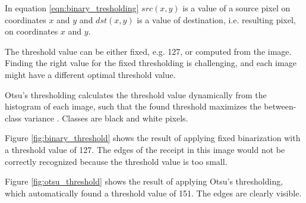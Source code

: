 \documentclass[
  printed, %
  table,   %
  oneside, %
  lof,     %
  lot,     %
]{fithesis3}
\begin{document}
\begin{enumerate}
    In equation \ref{eqn:binary_tresholding} $src(x,y)$ is a value of a source pixel on coordinates $x$ and $y$ and $dst(x,y)$ is a value of destination, i.e. resulting pixel, on coordinates $x$ and $y$.
    
    The threshold value can be either fixed, e.g. 127, or computed from the image. Finding the right value for the fixed thresholding is challenging, and each image might have a different optimal threshold value.
    
    Otsu's thresholding calculates the threshold value dynamically from the histogram of each image, such that the found threshold maximizes the between-class variance \cite{Gonzalez2008Digital}. Classes are black and white pixels.
    
    Figure \ref{fig:binary_threshold} shows the result of applying fixed binarization with a threshold value of 127. The edges of the receipt in this image would not be correctly recognized because the threshold value is too small.
    
    Figure \ref{fig:otsu_threshold} shows the result of applying Otsu's thresholding, which automatically found a threshold value of 151. The edges are clearly visible.
    

\end{enumerate}
\end{document}
